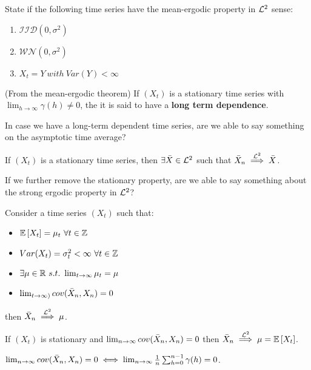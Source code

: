 \begin{exercise}
    State if the following time series have the mean-ergodic property in $\mathcal{L}^{2}$ sense:
    \begin{enumerate}
        \item $\mathcal{IID}(0,\sigma^2)$
        \item $\mathcal{WN}(0,\sigma^2)$
        \item $X_t=Y\ with\ Var(Y)<\infty$ 
    \end{enumerate}
\end{exercise}

\begin{definition}
    (From the mean-ergodic theorem) If $(X_t)$ is a stationary time series with $\lim_{h\to\infty}\gamma(h)\ne0$, the it is said to have a \textbf{long term dependence}.
\end{definition}

In case we have a long-term dependent time series, are we able to say something on the asymptotic time average?

\begin{theorem}
    If $(X_t)$ is a stationary time series, then $\exists\bar{X}\in\mathcal{L}^{2}$ such that $\bar{X}_n\stackrel{\mathcal{L}^{2}}{\implies}\bar{X}$. 
\end{theorem}

If we further remove the stationary property, are we able to say something about the strong ergodic property in $\mathcal{L}^{2}$?

\begin{theorem}
    Consider a time series $(X_t)$ such that:
    \begin{itemize}
        \item $\mathbb{E}\left[X_t\right]=\mu_t\ \forall t\in\mathbb{Z}$
        \item $Var(X_t)=\sigma^2_t<\infty\ \forall t\in\mathbb{Z}$
        \item $\exists\mu\in\R\ s.t.\ \lim_{t\to\infty}\mu_t=\mu$
        \item $\lim_{t\to\infty)}cov(\bar{X}_n,X_n)=0$
    \end{itemize}
    then $\bar{X}_n\stackrel{\mathcal{L}^{2}}{\implies}\mu$.
\end{theorem}

\begin{corollary}
    If $(X_t)$ is stationary and $\lim_{n\to\infty}cov(\bar{X}_n,X_n)=0$ then $\bar{X}_n\stackrel{\mathcal{L}^{2}}{\implies}\mu=\mathbb{E}\left[X_t\right]$.
\end{corollary}

\begin{remark}
    $\lim_{n\to\infty}cov(\bar{X}_n,X_n)=0\iff\lim_{n\to\infty}\frac{1}{n}\sum_{h=0}^{n-1}\gamma(h)=0$.
\end{remark}

